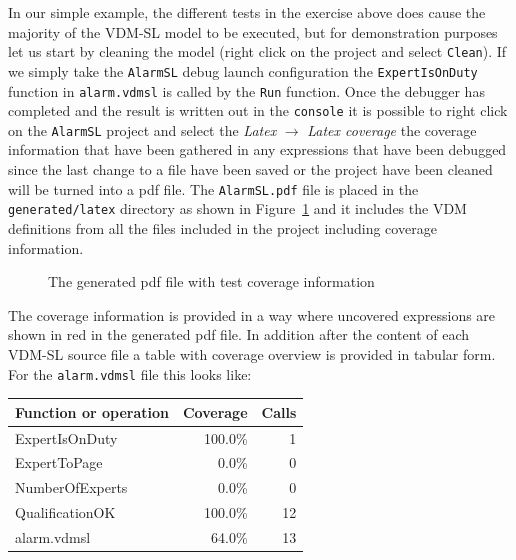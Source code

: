 {In our simple example, the different tests in the exercise above does
cause the majority of the VDM-SL model to be executed, but for
demonstration purposes let us start by cleaning the model (right click
on the project and select \texttt{Clean}). If we simply take the
\texttt{AlarmSL} debug launch configuration the
\verb|ExpertIsOnDuty| function in \verb|alarm.vdmsl| is called by the
\texttt{Run} function. Once the debugger has completed and the result
is written out in the \texttt{console} it is possible to right click
on the \texttt{AlarmSL} project and select the \emph{Latex} $
\rightarrow $ \emph{Latex coverage} the coverage information that have
been gathered in any expressions that have been debugged since the
last change to a file have been saved or the project have been cleaned
will be turned into a pdf file. The \texttt{AlarmSL.pdf} file is
placed in the \texttt{generated/latex} directory as shown in
Figure~\ref{fig:testcov} and it includes the
VDM definitions from all the files included in the project including
coverage information.  

\begin{figure}[tb]
\begin{center}
\end{center}
\caption{The generated pdf file with test coverage information\label{fig:testcov}}
\end{figure}

The coverage information is provided in a way where uncovered
expressions are shown in red in the generated pdf file. In addition
after the content of each VDM-SL source file a table with coverage
overview is provided in tabular form. For the \texttt{alarm.vdmsl}
file this looks like:

\begin{longtable}{|l|r|r|}
\hline
Function or operation & Coverage & Calls \\
\hline
\hline
ExpertIsOnDuty & 100.0\% & 1 \\
\hline
ExpertToPage & 0.0\% & 0 \\
\hline
NumberOfExperts & 0.0\% & 0 \\
\hline
QualificationOK & 100.0\% & 12 \\
\hline
\hline
alarm.vdmsl & 64.0\% & 13 \\
\hline
\end{longtable}

}
